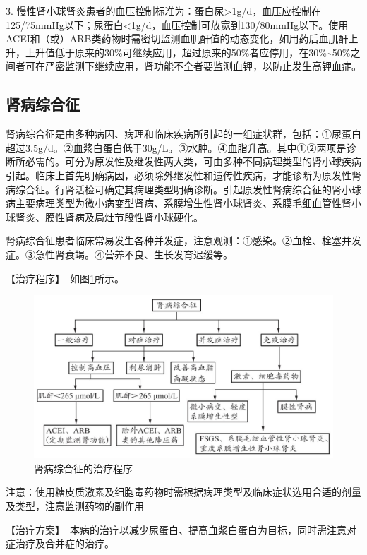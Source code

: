 3.
慢性肾小球肾炎患者的血压控制标准为：蛋白尿\textgreater{}1g/d，血压应控制在125/75mmHg以下；尿蛋白\textless{}1g/d，血压控制可放宽到130/80mmHg以下。使用ACEI和（或）ARB类药物时需密切监测血肌酐值的动态变化，如用药后血肌酐上升，上升值低于原来的30\%可继续应用，超过原来的50\%者应停用，在30\%\textasciitilde{}50\%之间者可在严密监测下继续应用，肾功能不全者要监测血钾，以防止发生高钾血症。

\subsection{肾病综合征}

肾病综合征是由多种病因、病理和临床疾病所引起的一组症状群，包括：①尿蛋白超过3.5g/d。②血浆白蛋白低于30g/L。③水肿。④血脂升高。其中①②两项是诊断所必需的。可分为原发性及继发性两大类，可由多种不同病理类型的肾小球疾病引起。临床上首先明确病因，必须除外继发性和遗传性疾病，才能诊断为原发性肾病综合征。行肾活检可确定其病理类型明确诊断。引起原发性肾病综合征的肾小球病主要病理类型为微小病变型肾病、系膜增生性肾小球肾炎、系膜毛细血管性肾小球肾炎、膜性肾病及局灶节段性肾小球硬化。

肾病综合征患者临床常易发生各种并发症，注意观测：①感染。②血栓、栓塞并发症。③急性肾衰竭。④营养不良、生长发育迟缓等。

【治疗程序】　如图\ref{fig4-1-4}所示。

\begin{figure}[!htbp]
 \centering
 \includegraphics{./images/Image00123.jpg}
 \captionsetup{justification=centering}
 \caption{肾病综合征的治疗程序}
 \label{fig4-1-4}
  \end{figure} 

注意：使用糖皮质激素及细胞毒药物时需根据病理类型及临床症状选用合适的剂量及类型，注意监测药物的副作用

【治疗方案】　本病的治疗以减少尿蛋白、提高血浆白蛋白为目标，同时需注意对症治疗及合并症的治疗。

